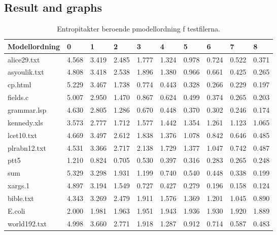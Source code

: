 \documentclass[a4paper,11pt]{article}
\begin{document}
\subsection{Result and graphs}
\begin{table}[h!]
  \label{entropitakt}
  \caption{Entropitakter beroende pmodellordning f testfilerna.}
  \begin{tabular}[h]{|l|l|l|l|l|l|l|l|l|l|}
    \hline
    Modellordning & 0     & 1     & 2     & 3     & 4     & 5     & 6     & 7     & 8\\
    \hline
    alice29.txt   & 4.568 & 3.419 & 2.485 & 1.777 & 1.324 & 0.978 & 0.724 & 0.522 & 0.371 \\ 
    asyoulik.txt  & 4.808 & 3.418 & 2.538 & 1.896 & 1.380 & 0.966 & 0.661 & 0.425 & 0.265 \\ 
    cp.html       & 5.229 & 3.467 & 1.738 & 0.774 & 0.443 & 0.328 & 0.266 & 0.229 & 0.197 \\ 
    fields.c      & 5.007 & 2.950 & 1.470 & 0.867 & 0.624 & 0.499 & 0.374 & 0.265 & 0.203 \\ 
    grammar.lsp   & 4.630 & 2.805 & 1.286 & 0.670 & 0.448 & 0.370 & 0.302 & 0.246 & 0.174 \\ 
    kennedy.xls   & 3.573 & 2.777 & 1.712 & 1.577 & 1.442 & 1.354 & 1.261 & 1.123 & 1.065 \\ 
    lcet10.txt    & 4.669 & 3.497 & 2.612 & 1.838 & 1.376 & 1.078 & 0.842 & 0.646 & 0.485 \\ 
    plrabn12.txt  & 4.531 & 3.366 & 2.717 & 2.138 & 1.729 & 1.377 & 1.047 & 0.742 & 0.487 \\ 
    ptt5          & 1.210 & 0.824 & 0.705 & 0.530 & 0.397 & 0.316 & 0.283 & 0.265 & 0.248 \\ 
    sum           & 5.329 & 3.298 & 1.931 & 1.199 & 0.740 & 0.540 & 0.448 & 0.338 & 0.199 \\ 
    xargs.1       & 4.897 & 3.194 & 1.549 & 0.727 & 0.427 & 0.279 & 0.196 & 0.158 & 0.124 \\ 
    bible.txt     & 4.343 & 3.269 & 2.479 & 1.911 & 1.576 & 1.369 & 1.201 & 1.045 & 0.890 \\ 
    E.coli        & 2.000 & 1.981 & 1.963 & 1.951 & 1.943 & 1.936 & 1.930 & 1.920 & 1.889 \\ 
    world192.txt  & 4.998 & 3.660 & 2.771 & 1.918 & 1.287 & 0.912 & 0.714 & 0.587 & 0.483 \\ 
    \hline
  \end{tabular}
\end{table}
\end{document}
